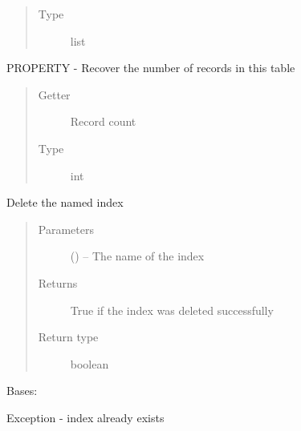 \documentclass[letterpaper,10pt,english]{sphinxmanual}
\begin{document}
\begin{fulllineitems}
\begin{fulllineitems}
\begin{quote}
\begin{description}
\item[{Type}] \leavevmode
list

\end{description}\end{quote}

\end{fulllineitems}


\begin{fulllineitems}
\label{\detokenize{index:mamba.Table.records}}
PROPERTY - Recover the number of records in this table
\begin{quote}\begin{description}
\item[{Getter}] \leavevmode
Record count

\item[{Type}] \leavevmode
int

\end{description}\end{quote}

\end{fulllineitems}


\begin{fulllineitems}
\label{\detokenize{index:mamba.Table.unindex}}
Delete the named index
\begin{quote}\begin{description}
\item[{Parameters}] \leavevmode
{} () -- The name of the index

\item[{Returns}] \leavevmode
True if the index was deleted successfully

\item[{Return type}] \leavevmode
boolean

\end{description}\end{quote}

\end{fulllineitems}


\end{fulllineitems}


\begin{fulllineitems}
\label{\detokenize{index:mamba.lmdb_IndexExists}}
Bases: 

Exception - index already exists

\end{fulllineitems}
\end{document}
